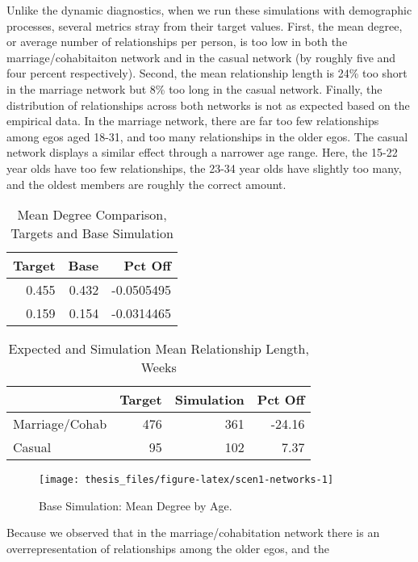\documentclass [11pt, proquest] {uwthesis}[2015/03/03]
\begin{document}
Unlike the dynamic diagnostics, when we run these simulations with
demographic processes, several metrics stray from their target values.
First, the mean degree, or average number of relationships per person,
is too low in both the marriage/cohabitaiton network and in the casual
network (by roughly five and four percent respectively). Second, the
mean relationship length is 24\% too short in the marriage network but
8\% too long in the casual network. Finally, the distribution of
relationships across both networks is not as expected based on the
empirical data. In the marriage network, there are far too few
relationships among egos aged 18-31, and too many relationships in the
older egos. The casual network displays a similar effect through a
narrower age range. Here, the 15-22 year olds have too few
relationships, the 23-34 year olds have slightly too many, and the
oldest members are roughly the correct amount.
\begin{table}

\caption{\label{tab:scen1-tab}Mean Degree Comparison, Targets and Base Simulation}
\centering
\begin{tabular}[t]{rrr}
\toprule
Target & Base & Pct Off\\
\midrule
0.455 & 0.432 & -0.0505495\\
0.159 & 0.154 & -0.0314465\\
\bottomrule
\end{tabular}
\end{table}
\begin{table}

\caption{\label{tab:scen1-duration}Expected and Simulation Mean Relationship Length, Weeks}
\centering
\begin{tabular}[t]{lrrr}
\toprule
  & Target & Simulation & Pct Off\\
\midrule
Marriage/Cohab & 476 & 361 & -24.16\\
Casual & 95 & 102 & 7.37\\
\bottomrule
\end{tabular}
\end{table}
\begin{figure}

{\centering \texttt{[image: thesis\_files/figure-latex/scen1-networks-1]} 

}

\caption{Base Simulation: Mean Degree by Age.}\label{fig:scen1-networks}
\end{figure}
Because we observed that in the marriage/cohabitation network there is
an overrepresentation of relationships among the older egos, and the
\end{document}
